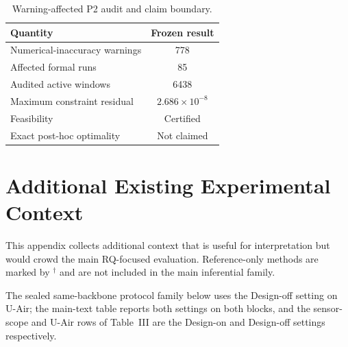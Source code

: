 \begin{table}[!t]
\centering
\caption{Warning-affected P2 audit and claim boundary.}
\label{tab:app_p2_warning_audit}
\footnotesize
\setlength{\tabcolsep}{5pt}
\begin{tabular*}{\columnwidth}{@{\extracolsep{\fill}}lc}
\toprule
Quantity & Frozen result\\
\midrule
Numerical-inaccuracy warnings & 778\\
Affected formal runs & 85\\
Audited active windows & 6438\\
Maximum constraint residual & $2.686\times10^{-8}$\\
Feasibility & Certified\\
Exact post-hoc optimality & Not claimed\\
\bottomrule
\end{tabular*}
\end{table}


\FloatBarrier

\section{Additional Existing Experimental Context}
\label{app:additional_context}

This appendix collects additional context that is useful for interpretation but
would crowd the main RQ-focused evaluation.  Reference-only methods are marked
by $^\dagger$ and are not included in the main inferential family.

The sealed same-backbone protocol family below uses the Design-off setting on U-Air;
the main-text table reports both settings on both blocks, and the
sensor-scope and U-Air rows of Table~III are the Design-on and Design-off
settings respectively.

